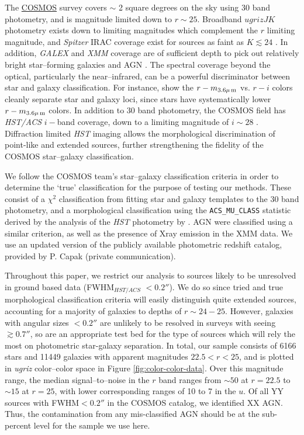 \documentclass[12pt,preprint]{aastex}
\begin{document}
The \href{http://cosmos.astro.caltech.edu/}{COSMOS} survey \citep{scoville07a} covers $\sim$ 2 square degrees on
the sky using 30 band photometry, and is magnitude limited down to $r
\sim 25$.  Broadband $ugrizJK$ photometry exists down to limiting
magnitudes which complement the $r$ limiting magnitude, and {\it
  Spitzer} IRAC coverage exist for sources as faint as $K\lesssim24$ 
  \citep{capak07,sanders07,taniguchi07}.
In addition, {\it GALEX} and {\it XMM} coverage are of sufficient
depth to pick out relatively bright star--forming galaxies and AGN 
\citep{hasinger07,zamojski07}.
The spectral coverage beyond the optical, particularly the
near--infrared, can be a powerful discriminator between star and
galaxy classification.  For instance, \citet{ilbert09} show the
$r-m_{\rm 3.6\mu\,m}$ vs. $r-i$ colors cleanly separate star and
galaxy loci, since stars have systematically lower $r-m_{\rm
  3.6\mu\,m}$ colors.  In addition to 30 band photometry, the COSMOS
field has \textit{HST/ACS} $i-$band coverage, down to a limiting
magnitude of $i\sim28$ \citep{koekemoer07,scoville07b}.  Diffraction
limited \textit{HST} imaging allows the morphological discrimination
of point-like and extended sources, further strengthening the fidelity
of the COSMOS star--galaxy classification.

We follow the COSMOS team's star--galaxy classification criteria 
in order to determine the `true' classification for the purpose of 
testing our methods.  These consist of a $\chi^2$ classification 
from fitting star and galaxy templates to the 30 band photometry, 
and a morphological classification using the 
{\tt ACS\_MU\_CLASS} statistic derived by the analysis of the 
\textit{HST} photometry by \citet{scarlata07}.  AGN were classified 
using a similar criterion, as well as the presence of Xray emission 
in the {XMM} data.  We use an updated version of the publicly 
available photometric redshift catalog, provided by P. Capak 
(private communication).  

Throughout this paper, we restrict our analysis to sources likely to
be unresolved in ground based data (FWHM$_{HST/ACS}$ $< 0.2''$).  We
do so since tried and true morphological classification criteria will
easily distinguish quite extended sources, accounting for a majority
of galaxies to depths of $r\sim24-25$.  However, galaxies with angular
sizes $< 0.2''$ are unlikely to be resolved in surveys with seeing
$\gtrsim0.7''$, so are an appropriate test bed for the type of sources
which will rely the most on photometric star-galaxy separation.  In
total, our sample consists of 6166 stars and 11449 galaxies with apparent 
magnitudes $22.5<r<25$, and is plotted in {\it ugriz} color--color space in
Figure \ref{fig:color-color-data}.   Over this magnitude range, the median 
signal--to--noise in the $r$ band ranges from $\sim50$ at $r=22.5$ to 
$\sim15$ at $r=25$, with lower corresponding ranges of 10 to 7 in the $u$.  
Of all YY sources with FWHM$<0.2''$ in the COSMOS catalog, we 
identified XX AGN.  Thus, the contamination from any mis-classified AGN 
should be at the sub-percent level for the sample we use here.
\end{document}
